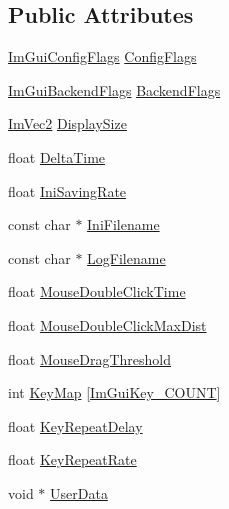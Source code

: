 \subsection*{Public Attributes}
\begin{DoxyCompactItemize}
\item 
\mbox{\hyperlink{imgui_8h_a91442880bed105ca5fe1be683b91d9a0}{Im\+Gui\+Config\+Flags}} \mbox{\hyperlink{struct_im_gui_i_o_a6267b8a1ffa964035e6540f5e4296e39}{Config\+Flags}}
\item 
\mbox{\hyperlink{imgui_8h_a6f5b9be7d9e718571c52a785a9f35ea0}{Im\+Gui\+Backend\+Flags}} \mbox{\hyperlink{struct_im_gui_i_o_a92288d3e802788c8c408eac2c12e709c}{Backend\+Flags}}
\item 
\mbox{\hyperlink{struct_im_vec2}{Im\+Vec2}} \mbox{\hyperlink{struct_im_gui_i_o_a042cfb90bdc9ccfe37f86b92ade759fd}{Display\+Size}}
\item 
float \mbox{\hyperlink{struct_im_gui_i_o_a5068d5414a19c2a1bf58029bd732a7c7}{Delta\+Time}}
\item 
float \mbox{\hyperlink{struct_im_gui_i_o_a9b37eea17baa240a93b1288673a6eeb9}{Ini\+Saving\+Rate}}
\item 
const char $\ast$ \mbox{\hyperlink{struct_im_gui_i_o_a89e8efe8f82b539c961dc22cc2499402}{Ini\+Filename}}
\item 
const char $\ast$ \mbox{\hyperlink{struct_im_gui_i_o_ae77a1beed11820366800645232a6ad1c}{Log\+Filename}}
\item 
float \mbox{\hyperlink{struct_im_gui_i_o_aee056f6ed15363e0bcd8d879b312da7c}{Mouse\+Double\+Click\+Time}}
\item 
float \mbox{\hyperlink{struct_im_gui_i_o_a13334c1522aadc12af0ce3b31b0eb3a1}{Mouse\+Double\+Click\+Max\+Dist}}
\item 
float \mbox{\hyperlink{struct_im_gui_i_o_ad8b9a9924b0d6bde6a0fa35c17aa54ae}{Mouse\+Drag\+Threshold}}
\item 
int \mbox{\hyperlink{struct_im_gui_i_o_aa1cd0083960f8e5361eb6d49973c8823}{Key\+Map}} \mbox{[}\mbox{\hyperlink{imgui_8h_a683cc5d09c63d74035a98ac3b0dec545aec3107a9dcdc5632cdcd57d4f8bbed18}{Im\+Gui\+Key\+\_\+\+C\+O\+U\+NT}}\mbox{]}
\item 
float \mbox{\hyperlink{struct_im_gui_i_o_a390537e7cba21b98a8f89df857ea59fb}{Key\+Repeat\+Delay}}
\item 
float \mbox{\hyperlink{struct_im_gui_i_o_accd71987c895c4aec6d1a8c368cc9e0e}{Key\+Repeat\+Rate}}
\item 
void $\ast$ \mbox{\hyperlink{struct_im_gui_i_o_a8c5e74fd39c2655455329e09529da7d3}{User\+Data}}

\end{DoxyCompactItemize}
